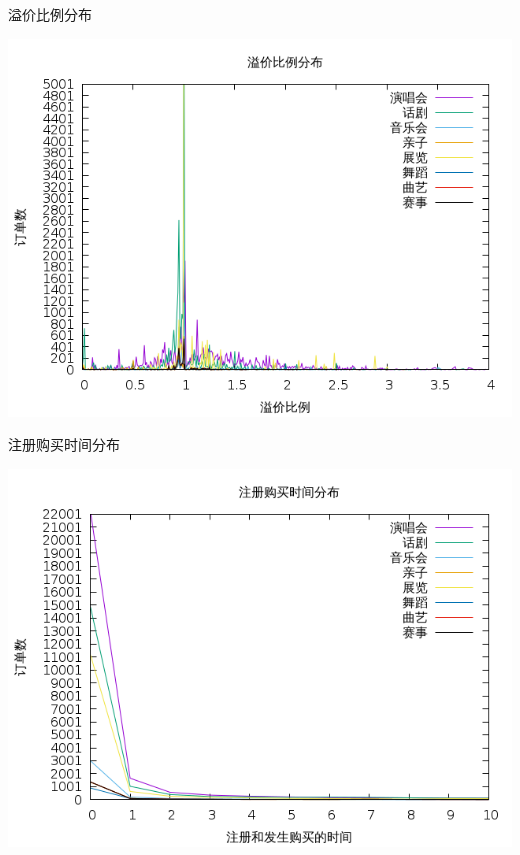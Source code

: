 \documentclass[presentation, bigger]{beamer}
\begin{document}
\begin{frame}[label={sec:orge518a8b}]{溢价比例分布}
\begin{center}
\includegraphics[width=.9\linewidth]{./image/over-distribution.png}
\end{center}
\end{frame}
\begin{frame}[label={sec:org855a38b}]{注册购买时间分布}
\begin{center}
\includegraphics[width=.9\linewidth]{./image/register-distribution.png}
\end{center}
\end{frame}
\end{document}

